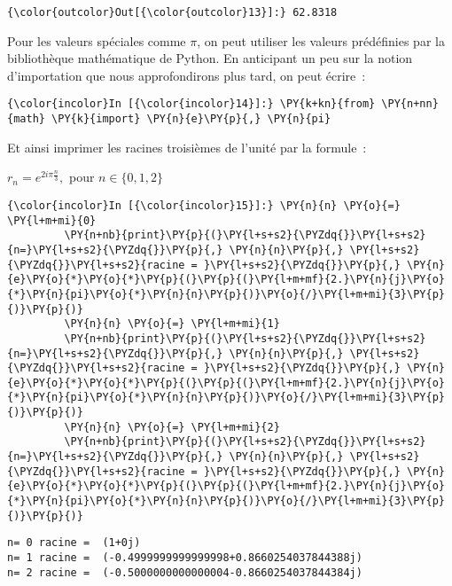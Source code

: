\begin{Verbatim}[commandchars=\\\{\}]
{\color{outcolor}Out[{\color{outcolor}13}]:} 62.8318
\end{Verbatim}
            
    Pour les valeurs spéciales comme \(\pi\), on peut utiliser les valeurs
prédéfinies par la bibliothèque mathématique de Python. En anticipant un
peu sur la notion d'importation que nous approfondirons plus tard, on
peut écrire~:

    \begin{Verbatim}[commandchars=\\\{\}]
{\color{incolor}In [{\color{incolor}14}]:} \PY{k+kn}{from} \PY{n+nn}{math} \PY{k}{import} \PY{n}{e}\PY{p}{,} \PY{n}{pi}
\end{Verbatim}


    Et ainsi imprimer les racines troisièmes de l'unité par la formule~:

\(r_n = e^{2i\pi \frac{n}{3}},\) pour \(n\in \{0,1,2\}\)

    \begin{Verbatim}[commandchars=\\\{\}]
{\color{incolor}In [{\color{incolor}15}]:} \PY{n}{n} \PY{o}{=} \PY{l+m+mi}{0}
         \PY{n+nb}{print}\PY{p}{(}\PY{l+s+s2}{\PYZdq{}}\PY{l+s+s2}{n=}\PY{l+s+s2}{\PYZdq{}}\PY{p}{,} \PY{n}{n}\PY{p}{,} \PY{l+s+s2}{\PYZdq{}}\PY{l+s+s2}{racine = }\PY{l+s+s2}{\PYZdq{}}\PY{p}{,} \PY{n}{e}\PY{o}{*}\PY{o}{*}\PY{p}{(}\PY{p}{(}\PY{l+m+mf}{2.}\PY{n}{j}\PY{o}{*}\PY{n}{pi}\PY{o}{*}\PY{n}{n}\PY{p}{)}\PY{o}{/}\PY{l+m+mi}{3}\PY{p}{)}\PY{p}{)}
         \PY{n}{n} \PY{o}{=} \PY{l+m+mi}{1}
         \PY{n+nb}{print}\PY{p}{(}\PY{l+s+s2}{\PYZdq{}}\PY{l+s+s2}{n=}\PY{l+s+s2}{\PYZdq{}}\PY{p}{,} \PY{n}{n}\PY{p}{,} \PY{l+s+s2}{\PYZdq{}}\PY{l+s+s2}{racine = }\PY{l+s+s2}{\PYZdq{}}\PY{p}{,} \PY{n}{e}\PY{o}{*}\PY{o}{*}\PY{p}{(}\PY{p}{(}\PY{l+m+mf}{2.}\PY{n}{j}\PY{o}{*}\PY{n}{pi}\PY{o}{*}\PY{n}{n}\PY{p}{)}\PY{o}{/}\PY{l+m+mi}{3}\PY{p}{)}\PY{p}{)}
         \PY{n}{n} \PY{o}{=} \PY{l+m+mi}{2}
         \PY{n+nb}{print}\PY{p}{(}\PY{l+s+s2}{\PYZdq{}}\PY{l+s+s2}{n=}\PY{l+s+s2}{\PYZdq{}}\PY{p}{,} \PY{n}{n}\PY{p}{,} \PY{l+s+s2}{\PYZdq{}}\PY{l+s+s2}{racine = }\PY{l+s+s2}{\PYZdq{}}\PY{p}{,} \PY{n}{e}\PY{o}{*}\PY{o}{*}\PY{p}{(}\PY{p}{(}\PY{l+m+mf}{2.}\PY{n}{j}\PY{o}{*}\PY{n}{pi}\PY{o}{*}\PY{n}{n}\PY{p}{)}\PY{o}{/}\PY{l+m+mi}{3}\PY{p}{)}\PY{p}{)}
\end{Verbatim}


    \begin{Verbatim}[commandchars=\\\{\}]
n= 0 racine =  (1+0j)
n= 1 racine =  (-0.4999999999999998+0.8660254037844388j)
n= 2 racine =  (-0.5000000000000004-0.8660254037844384j)

    \end{Verbatim}

